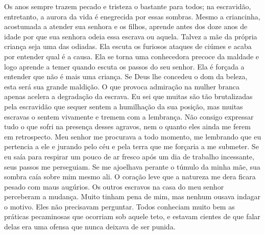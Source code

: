 Os anos sempre trazem pecado e tristeza
o bastante para todos; na escravidão, entretanto, a aurora da vida é
enegrecida por essas sombras. Mesmo a criancinha, acostumada a atender
sua senhora e os filhos, aprende antes dos doze anos de idade por que
sua senhora odeia essa escrava ou aquela. Talvez a mãe da própria
criança seja uma das odiadas. Ela escuta os furiosos ataques de ciúmes e
acaba por entender qual é a causa. Ela se torna uma conhecedora precoce
da maldade e logo aprende a temer quando escuta os passos do seu senhor.
Ela é forçada a entender que não é mais uma criança. Se Deus lhe
concedeu o dom da beleza, esta será sua grande maldição. O que provoca
admiração na mulher branca apenas acelera a degradação da escrava. Eu
sei que muitas são tão brutalizadas pela escravidão que sequer sentem a
humilhação da sua posição, mas muitas escravas o sentem vivamente e
tremem com a lembrança. Não consigo expressar tudo o que sofri na
presença desses agravos, nem o quanto eles ainda me ferem em
retrospecto. Meu senhor me procurava a todo momento, me lembrando que eu
pertencia a ele e jurando pelo céu e pela terra que me forçaria a me
submeter. Se eu saía para respirar um pouco de ar fresco após um dia de
trabalho incessante, seus passos me perseguiam. Se me ajoelhava perante
o túmulo da minha mãe, sua sombra caía sobre mim mesmo ali. O coração
leve que a natureza me dera ficara pesado com maus augúrios. Os outros
escravos na casa do meu senhor perceberam a mudança. Muito tinham pena
de mim, mas nenhum ousava indagar o motivo. Eles não precisavam
perguntar. Todos conheciam muito bem as práticas pecaminosas que
ocorriam sob aquele teto, e estavam cientes de que falar delas era uma
ofensa que nunca deixava de ser punida.

